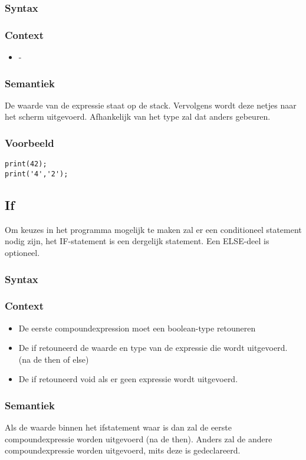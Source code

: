\documentclass[]{article}
\begin{document}
\subsubsection{Syntax}

\subsubsection{Context}
\begin{itemize}
\item -
\end{itemize}
\subsubsection{Semantiek}
De waarde van de expressie staat op de stack. Vervolgens wordt deze netjes naar het scherm uitgevoerd. Afhankelijk van het type zal dat anders gebeuren. 
\subsubsection{Voorbeeld}
\begin{lstlisting}[style=SELMA]
print(42);
print('4','2');
\end{lstlisting}

\subsection{If}
Om keuzes in het programma mogelijk te maken zal er een conditioneel statement nodig zijn, het IF-statement is een dergelijk statement. Een ELSE-deel is optioneel.
\subsubsection{Syntax}

\subsubsection{Context}
\begin{itemize}
\item De eerste compoundexpression moet een boolean-type retouneren
\item De if retouneerd de waarde en type van de expressie die wordt uitgevoerd. (na de then of else)
\item De if retouneerd void als er geen expressie wordt uitgevoerd.
\end{itemize}
\subsubsection{Semantiek}
Als de waarde binnen het ifstatement waar is dan zal de eerste compoundexpressie worden uitgevoerd (na de then). Anders zal de andere compoundexpressie worden uitgevoerd, mits deze is gedeclareerd.
\end{document}
